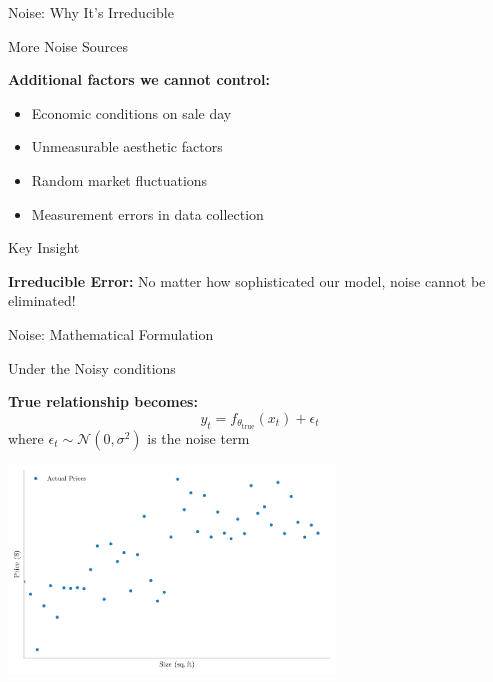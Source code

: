 \documentclass[10pt]{beamer}
\newcommand{\fitpic}[1]{\begin{adjustbox}{max width=\linewidth, max totalheight=0.78\textheight}#1\end{adjustbox}}
\begin{document}
\begin{frame}{Noise: Why It's Irreducible}
\small
\begin{examplebox}{More Noise Sources}
\raggedright
\textbf{Additional factors we cannot control:}
\begin{itemize}
\item Economic conditions on sale day
\item Unmeasurable aesthetic factors
\item Random market fluctuations
\item Measurement errors in data collection
\end{itemize}
\end{examplebox}

\begin{alertbox}{Key Insight}
\raggedright
\textbf{Irreducible Error:} No matter how sophisticated our model, noise cannot be eliminated!
\end{alertbox}
\end{frame}

\begin{frame}{Noise: Mathematical Formulation}
\small
\begin{keypointsbox}{Under the Noisy conditions}
\raggedright
\textbf{True relationship becomes:}
$$y_t = f_{\theta_{\text{true}}}(x_t) + \epsilon_t$$
where $\epsilon_t \sim \mathcal{N}(0, \sigma^2)$ is the noise term
\end{keypointsbox}

\begin{center}
\fitpic{\includegraphics[width=0.65\textwidth]{../assets/bias-variance/figures/data_latexify.pdf}}
\end{center}
\end{frame}
\end{document}
